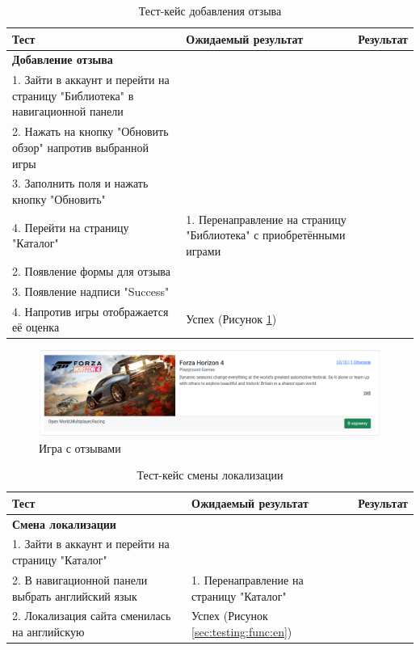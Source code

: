 \begin{table}[!htb]
	\caption{Тест-кейс добавления отзыва}
	\label{table:testing:func:test6}
	\centering
	  \begin{tabular}{| >{\raggedright}m{} 
					  | >{\raggedright}m{} 
					  | >{\raggedright\arraybackslash}m{}|}
	  \hline Тест & Ожидаемый результат  & Результат \\
	  \hline \textbf{Добавление отзыва} \\ 1. Зайти в аккаунт и перейти на страницу "Библиотека" в навигационной панели \\ 2. Нажать на кнопку "Обновить обзор" напротив выбранной игры \\ 3. Заполнить поля и нажать кнопку "Обновить" \\ 4. Перейти на страницу "Каталог" & 1. Перенаправление на страницу "Библиотека" с приобретёнными играми \\ 2. Появление формы для отзыва \\ 3. Появление надписи "Success" \\ 4. Напротив игры отображается её оценка & Успех (Рисунок \ref*{sec:testing:func:review})\\
	  \hline
	  \end{tabular}
\end{table}

\begin{figure}[!htb]
	\centering
	  \includegraphics[scale=0.33]{attachments/review.png}  
	  \caption{ Игра с отзывами }
	  \label{sec:testing:func:review}
\end{figure}
\clearpage
\begin{table}[!ht]
	\caption{Тест-кейс смены локализации}
	\label{table:testing:func:test7}
	\centering
	  \begin{tabular}{| >{\raggedright}m{0.4\textwidth} 
					  | >{\raggedright}m{0.3\textwidth} 
					  | >{\raggedright\arraybackslash}m{}|}
	  \hline Тест & Ожидаемый результат  & Результат \\
	  \hline \textbf{Смена локализации} \\ 1. Зайти в аккаунт и перейти на страницу "Каталог" \\ 2. В навигационной панели выбрать английский язык & 1. Перенаправление на страницу "Каталог" \\ 2. Локализация сайта сменилась на английскую & Успех (Рисунок \ref*{sec:testing:func:en})\\
	  \hline
	  \end{tabular}
\end{table}

